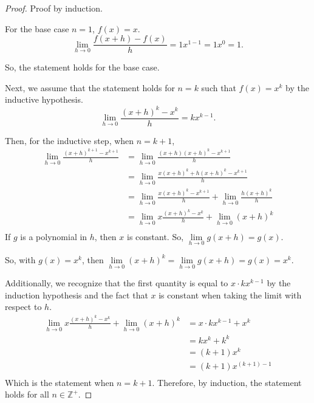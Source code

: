 \documentclass[../m134a-hw2.tex]{subfiles}
\begin{document}
\begin{proof}
    Proof by induction.

    For the base case $n=1$, $f(x)=x$.
    \[\lim\limits_{h \to 0} \frac{f(x+h) - f(x)}{h} = 1x^{1-1} = 1x^0 = 1.\]

    So, the statement holds for the base case.

    Next, we assume that the statement holds for $n = k$ such that $f(x) = x^k$ by the inductive hypothesis.
    \[\lim\limits_{h\to0} \frac{{(x+h)}^k-x^k}{h} = kx^{k-1}.\]

    Then, for the inductive step, when $n = k+1$,
    \begin{align*}
        \lim\limits_{h \to 0} \frac{{(x+h)}^{k+1}-x^{k+1}}{h} &= \lim\limits_{h \to 0} \frac{(x+h){(x+h)}^k-x^{k+1}}{h} \\
        &= \lim\limits_{h \to 0} \frac{x{(x+h)}^k+h{(x+h)}^k-x^{k+1}}{h} \\
        &= \lim\limits_{h \to 0} \frac{x{(x+h)}^k-x^{k+1}}{h} + \lim\limits_{h \to 0} \frac{h{(x+h)}^k}{h} \\
        &= \lim\limits_{h \to 0} x \frac{{(x+h)}^k-x^k}{h} + \lim\limits_{h \to 0} {(x+h)}^k \\
    \end{align*}
    If $g$ is a polynomial in $h$, then $x$ is constant. So, $\lim\limits_{h \to 0} g(x + h) = g(x)$.
    
    So, with $g(x) = x^k$, then $\lim\limits_{h \to 0} {(x+h)}^k = \lim\limits_{h \to 0} g(x+h) = g(x) = x^k$.

    Additionally, we recognize that the first quantity is equal to $x \cdot kx^{k-1}$ by the induction hypothesis and the fact that $x$ is constant when taking the limit with respect to $h$.
    \begin{align*}
        \lim\limits_{h \to 0} x \frac{{(x+h)}^k-x^k}{h} + \lim\limits_{h \to 0} {(x+h)}^k &= x \cdot kx^{k-1} + x^k \\
        &= kx^k + k^k \\
        &= (k+1)x^k \\
        &= (k+1)x^{(k+1)-1} \\
    \end{align*}
    Which is the statement when $n = k+1$. Therefore, by induction, the statement holds for all $n \in \mathbb{Z}^+$.
    
\end{proof}
\end{document}

